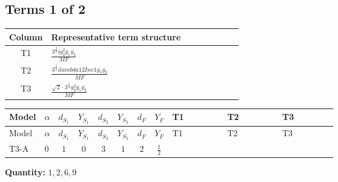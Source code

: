 \documentclass[8pt]{article}
\begin{document}
\begin{landscape}
\subsection*{Terms 1 of 2}
\begin{center}
\begin{tabular}{@{}c >{\raggedright\arraybackslash}p{0.82\linewidth}@{}}
\toprule
Column & Representative term structure \\
\midrule
T1 & \(\displaystyle \frac{3^{\frac{3}{4}} i g_{2}^{2} \overline{y_{1}} \overline{y_{2}}}{MF}\) \\
\midrule
T2 & \(\displaystyle \frac{3^{\frac{3}{4}} i lambda12Inv1 \overline{y_{1}} \overline{y_{2}}}{MF}\) \\
\midrule
T3 & \(\displaystyle \frac{\sqrt{2} \cdot 3^{\frac{3}{4}} g_{2}^{2} \overline{y_{1}} \overline{y_{2}}}{MF}\) \\
\midrule
\bottomrule
\end{tabular}
\end{center}
\smallskip
\tiny
\begin{longtable}{@{}llcccccc >{\raggedright\arraybackslash}p{0.21\linewidth} >{\raggedright\arraybackslash}p{0.21\linewidth} >{\raggedright\arraybackslash}p{0.21\linewidth}@{}}
\toprule
Model & $\alpha$ & $d_{S_1}$ & $Y_{S_1}$ & $d_{S_2}$ & $Y_{S_2}$ & $d_F$ & $Y_F$ & T1 & T2 & T3 \\
\midrule
\endfirsthead
\toprule
Model & $\alpha$ & $d_{S_1}$ & $Y_{S_1}$ & $d_{S_2}$ & $Y_{S_2}$ & $d_F$ & $Y_F$ & T1 & T2 & T3 \\
\midrule
\endhead
T3-A & $0$ & $1$ & $0$ & $3$ & $1$ & $2$ & $\frac{1}{2}$ & \scriptsize\adjustbox{max width=\linewidth}{$\begin{gathered} - \frac{25 \cdot 3^{\frac{3}{4}} i g_{2}^{2} \overline{y_{1}} \overline{y_{2}}}{24 MF}\end{gathered}$} & \scriptsize\adjustbox{max width=\linewidth}{$\begin{gathered} - \frac{3^{\frac{3}{4}} i lambda12Inv1 \overline{y_{1}} \overline{y_{2}}}{6 MF}\end{gathered}$} & \scriptsize\adjustbox{max width=\linewidth}{$\begin{gathered} - \frac{\sqrt{2} \cdot 3^{\frac{3}{4}} g_{2}^{2} \overline{y_{1}} \overline{y_{2}}}{6 MF}\end{gathered}$} \\
\midrule
\bottomrule
\end{longtable}
\clearpage
\noindent\textbf{Quantity: }$\mathrm{1,2,6,9}$\par\smallskip

\end{landscape}
\end{document}
